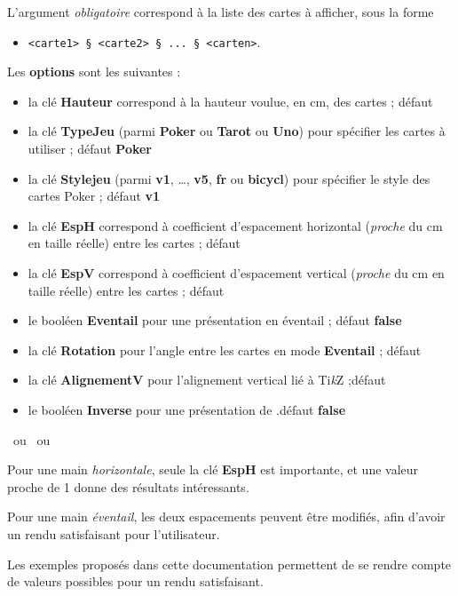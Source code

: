 \documentclass[a4paper]{article}
\providecommand\tikzlogo{Ti\textit{k}Z}
\let\TikZ\tikzlogo
\newcommand\cmaj[1]{\tcbox[vignetteMaJ]{#1}\xspace}
\newcommand\Cle[1]{{\bfseries\sffamily\textlangle #1\textrangle}}
\begin{document}
\begin{codecles}
L'argument \textit{obligatoire} correspond à la liste des cartes à afficher, sous la forme 

\begin{itemize}
	\item \texttt{<carte1> § <carte2> § ... § <carten>}.
\end{itemize}

Les \Cle{options} sont les suivantes :

\begin{itemize}
	\item la clé \Cle{Hauteur} correspond à la hauteur voulue, en cm, des cartes ; \hfill{}défaut \Cle{4.25}
	\item la clé \Cle{TypeJeu} (parmi \Cle{Poker} ou \Cle{Tarot} ou \Cle{Uno}) pour spécifier les cartes à utiliser ; \hfill{}défaut \Cle{Poker}
	\item \cmaj{0.2.4} la clé \Cle{Stylejeu} (parmi \Cle{v1}, \ldots, \Cle{v5}, \Cle{fr} ou \Cle{bicycl}) pour spécifier le style des cartes \textsf{Poker} ; \hfill{}défaut \Cle{v1}
	\item la clé \Cle{EspH} correspond à coefficient d'espacement horizontal (\textit{proche} du cm en taille réelle) entre les cartes ; \hfill{}défaut \Cle{1}
	\item la clé \Cle{EspV} correspond à coefficient d'espacement vertical (\textit{proche} du cm en taille réelle) entre les cartes ; \hfill{}défaut \Cle{0}
	\item le booléen \Cle{Eventail} pour une présentation en éventail ; \hfill{}défaut \Cle{false}
	\item la clé \Cle{Rotation} pour l'angle entre les cartes en mode \Cle{Eventail}  ; \hfill{}défaut \Cle{10}
	\item la clé \Cle{AlignementV} pour l'alignement vertical lié à \TikZ{} ;\hfill{}défaut \Cle{0.5}
	\item le booléen \Cle{Inverse} pour une présentation de .\hfill{}défaut \Cle{false}
\end{itemize}
\end{codecles}

\begin{codetex}[]
~ou 
~ou 
\end{codetex}

\begin{codeinfo}
Pour une main \textit{horizontale}, seule la clé \Cle{EspH} est importante, et une valeur proche de 1 donne des résultats intéressants.

\smallskip

Pour une main \textit{éventail}, les deux espacements peuvent être modifiés, afin d'avoir un rendu satisfaisant pour l'utilisateur.

\smallskip

Les exemples proposés dans cette documentation permettent de se rendre compte de valeurs possibles pour un rendu satisfaisant.
\end{codeinfo}
\end{document}
